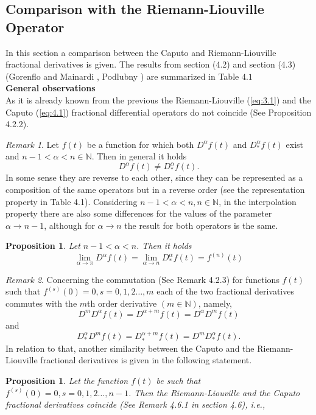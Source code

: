 \documentclass[a4paper,14pt,oneside]{book}
\theoremstyle{plain}
\newtheorem{prop}[thm]{Proposition}
\theoremstyle{definition}
\theoremstyle{remark}
\newtheorem{rmk}{Remark}[section]
\begin{document}
\begin{center}
\begin{flushleft}
{\section{Comparison with the Riemann-Liouville Operator}
In this section a comparison between the Caputo and Riemann-Liouville fractional derivatives is given. The results from section (4.2) and section (4.3) (Gorenflo and Mainardi \cite{bb18}, Podlubny \cite{bb22}) are summarized in Table $4.1$\\
 \textbf{General observations}\\
As it is already known from the previous the Riemann-Liouville (\ref{eq:3.1}) and the Caputo (\ref{eq:4.1}) fractional differential operators do not coincide (See Proposition 4.2.2).
\begin{rmk}
Let $f(t)$ be a function for which both $D^{\alpha} f(t)$ and $D_{*}^{\alpha} f(t)$ exist and $n-1<\alpha<n \in \mathbb{N}$. Then in general it holds
$$
D^{\alpha} f(t) \neq D_{*}^{\alpha} f(t) .
$$
In some sense they are reverse to each other, since they can be represented as a composition of the same operators but in a reverse order (see the representation property in Table 4.1). Considering $n-1<\alpha<n, n \in \mathbb{N}$, in the interpolation property there are also some differences for the values of the parameter $\alpha \rightarrow n-1$, although for $\alpha \rightarrow n$ the result for both operators is the same.
\end{rmk}
\begin{prop}
Let $n-1<\alpha<n$. Then it holds
$$
\lim_{\alpha \rightarrow \pi} D^{\alpha} f(t)=\lim_{\alpha \rightarrow n} D_{*}^{\alpha} f(t)=f^{(n)}(t)
$$
\end{prop}
\begin{rmk}
Concerning the commutation (See Remark 4.2.3) for functions $f(t)$ such that $f^{(s)}(0)=0, s=0,1,2 \ldots, m$ each of the two fractional derivatives commutes with the $m$th order derivative $(m \in \mathbb{N})$, namely,
$$
D^{m} D^{\alpha} f(t)=D^{\alpha+m} f(t)=D^{\alpha} D^{m} f(t)
$$
and
$$
D_{*}^{\alpha} D^{m} f(t)=D_{*}^{\alpha+m} f(t)=D^{m} D_{*}^{\alpha} f(t) .
$$
In relation to that, another similarity between the Caputo and the Riemann-Liouville fractional derivatives is given in the following statement.
\end{rmk}
\begin{prop}
Let the function $f(t)$ be such that $f^{(s)}(0)=0, s=0,1,2 \ldots, n-1$. Then the Riemann-Liouville and the Caputo fractional derivatives coincide (See Remark 4.6.1 in section 4.6), i.e.,

\end{prop}}
\end{flushleft}
\end{center}
\end{document}
